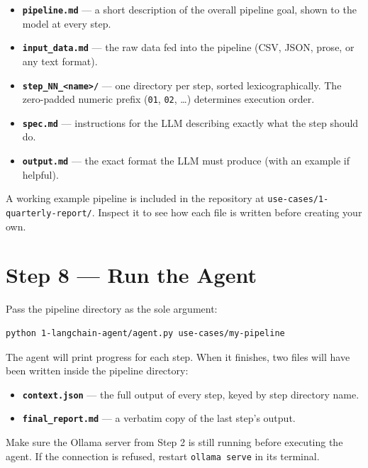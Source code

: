 \documentclass[12pt, a4paper]{article}
\begin{document}
\begin{itemize}[leftmargin=1.5em]
  \item \textbf{\texttt{pipeline.md}} — a short description of the overall pipeline goal, shown to the model at every step.
  \item \textbf{\texttt{input\_data.md}} — the raw data fed into the pipeline (CSV, JSON, prose, or any text format).
  \item \textbf{\texttt{step\_NN\_<name>/}} — one directory per step, sorted lexicographically. The zero-padded numeric prefix (\texttt{01}, \texttt{02}, \ldots) determines execution order.
  \item \textbf{\texttt{spec.md}} — instructions for the LLM describing exactly what the step should do.
  \item \textbf{\texttt{output.md}} — the exact format the LLM must produce (with an example if helpful).
\end{itemize}

\begin{notebox}
A working example pipeline is included in the repository at \texttt{use-cases/1-quarterly-report/}. Inspect it to see how each file is written before creating your own.
\end{notebox}

\section{Step 8 — Run the Agent}

Pass the pipeline directory as the sole argument:

\begin{lstlisting}[style=shellstyle]
python 1-langchain-agent/agent.py use-cases/my-pipeline
\end{lstlisting}

The agent will print progress for each step. When it finishes, two files will have been written inside the pipeline directory:

\begin{itemize}[leftmargin=1.5em]
  \item \textbf{\texttt{context.json}} — the full output of every step, keyed by step directory name.
  \item \textbf{\texttt{final\_report.md}} — a verbatim copy of the last step's output.
\end{itemize}

\begin{warnbox}
Make sure the Ollama server from Step 2 is still running before executing the agent. If the connection is refused, restart \texttt{ollama serve} in its terminal.
\end{warnbox}
\end{document}
